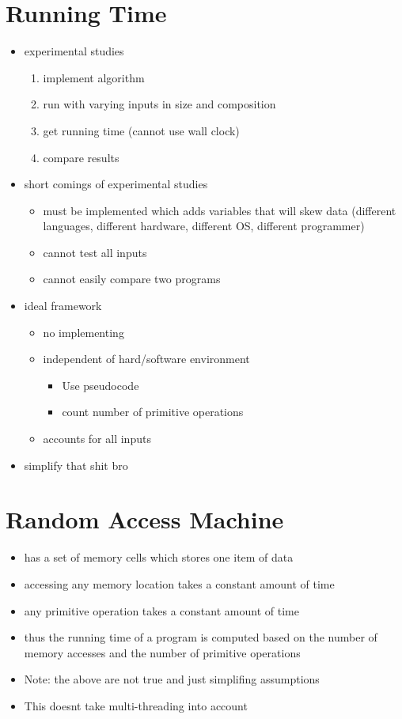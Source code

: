 \documentclass[12pt]{article}
\begin{document}
\section*{Running Time}
\begin{itemize}
\item experimental studies
\begin{enumerate}
\item implement algorithm
\item run with varying inputs in size and composition
\item get running time (cannot use wall clock)
\item compare results
\end{enumerate}
\item short comings of experimental studies
\begin{itemize}
\item must be implemented which adds variables that will skew data (different languages, different hardware, different OS, different programmer)
\item cannot test all inputs
\item cannot easily compare two programs
\end{itemize}
\item ideal framework
\begin{itemize}
\item no implementing
\item independent of hard/software environment
\begin{itemize}
\item Use pseudocode
\item count number of primitive operations
\end{itemize}
\item accounts for all inputs
\end{itemize}
\item simplify that shit bro
\end{itemize}

\section*{Random Access Machine}
\begin{itemize}
\item has a set of memory cells which stores one item of data
\item accessing any memory location takes a constant amount of time
\item any primitive operation takes a constant amount of time
\item thus the running time of a program is computed based on the number of memory accesses and the number of primitive operations
\item Note: the above are not true and just simplifing assumptions
\item This doesnt take multi-threading into account
\end{itemize}
\end{document}
